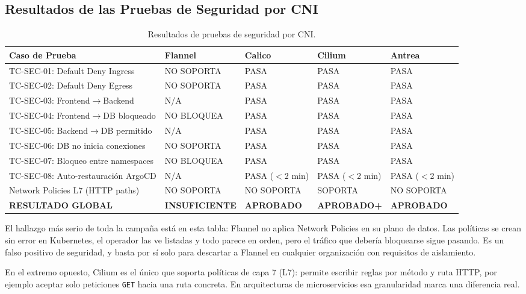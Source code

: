 \subsection{Resultados de las Pruebas de Seguridad por CNI}

\begin{table}[htbp]
\centering
\scriptsize
\caption{Resultados de pruebas de seguridad por CNI.}
\label{tab:resultados-seguridad}
\begin{tabularx}{\textwidth}{|Y|Y|Y|Y|Y|}
\hline
\textbf{Caso de Prueba} & \textbf{Flannel} & \textbf{Calico} & \textbf{Cilium} & \textbf{Antrea} \\
\hline
TC-SEC-01: Default Deny Ingress & NO SOPORTA & PASA & PASA & PASA \\
\hline
TC-SEC-02: Default Deny Egress & NO SOPORTA & PASA & PASA & PASA \\
\hline
TC-SEC-03: Frontend$\rightarrow$Backend & N/A & PASA & PASA & PASA \\
\hline
TC-SEC-04: Frontend$\rightarrow$DB bloqueado & NO BLOQUEA & PASA & PASA & PASA \\
\hline
TC-SEC-05: Backend$\rightarrow$DB permitido & N/A & PASA & PASA & PASA \\
\hline
TC-SEC-06: DB no inicia conexiones & NO SOPORTA & PASA & PASA & PASA \\
\hline
TC-SEC-07: Bloqueo entre namespaces & NO BLOQUEA & PASA & PASA & PASA \\
\hline
TC-SEC-08: Auto-restauración ArgoCD & N/A & PASA ($<$2 min) & PASA ($<$2 min) & PASA ($<$2 min) \\
\hline
Network Policies L7 (HTTP paths) & NO SOPORTA & NO SOPORTA & SOPORTA & NO SOPORTA \\
\hline
\textbf{RESULTADO GLOBAL} & \textbf{INSUFICIENTE} & \textbf{APROBADO} & \textbf{APROBADO+} & \textbf{APROBADO} \\
\hline
\end{tabularx}
\end{table}

El hallazgo más serio de toda la campaña está en esta tabla: Flannel no aplica Network Policies en su plano de datos. Las políticas se crean sin error en Kubernetes, el operador las ve listadas y todo parece en orden, pero el tráfico que debería bloquearse sigue pasando. Es un falso positivo de seguridad, y basta por sí solo para descartar a Flannel en cualquier organización con requisitos de aislamiento.

En el extremo opuesto, Cilium es el único que soporta políticas de capa 7 (L7): permite escribir reglas por método y ruta HTTP, por ejemplo aceptar solo peticiones \texttt{GET} hacia una ruta concreta. En arquitecturas de microservicios esa granularidad marca una diferencia real.

